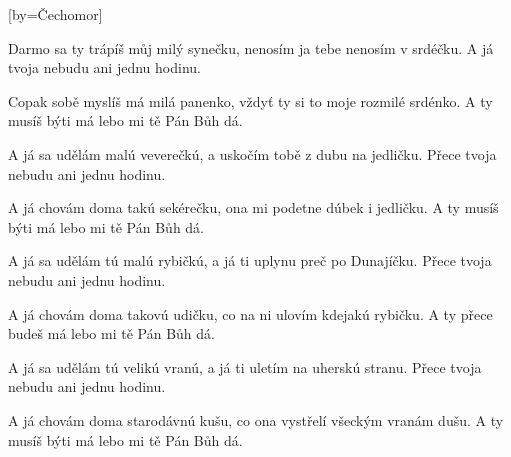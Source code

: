 [by={Čechomor}]

\beginverse{}
Darmo sa ty trápíš můj milý synečku,
nenosím ja tebe nenosím v srdéčku.
A já tvoja nebudu ani jednu hodinu.
\endverse{}

\beginverse{}
Copak sobě myslíš má milá panenko,
vždyť ty si to moje rozmilé srdénko.
A ty musíš býti má lebo mi tě Pán Bůh dá.
\endverse{}

\beginverse{}
A já sa udělám malú veverečkú,
a uskočím tobě z dubu na jedličku.
Přece tvoja nebudu ani jednu hodinu.
\endverse{}

\beginverse{}
A já chovám doma takú sekérečku,
ona mi podetne dúbek i jedličku.
A ty musíš býti má lebo mi tě Pán Bůh dá.
\endverse{}

\beginverse{}
A já sa udělám tú malú rybičkú,
a já ti uplynu preč po Dunajíčku.
Přece tvoja nebudu ani jednu hodinu.
\endverse{}

\beginverse{}
A já chovám doma takovú udičku,
co na ni ulovím kdejakú rybičku.
A ty přece budeš má lebo mi tě Pán Bůh dá.
\endverse{}

\beginverse{}
A já sa udělám tú velikú vranú,
a já ti uletím na uherskú stranu.
Přece tvoja nebudu ani jednu hodinu.
\endverse{}

\beginverse{}
A já chovám doma starodávnú kušu,
co ona vystřelí všeckým vranám dušu.
A ty musíš býti má lebo mi tě Pán Bůh dá.
\endverse{}

